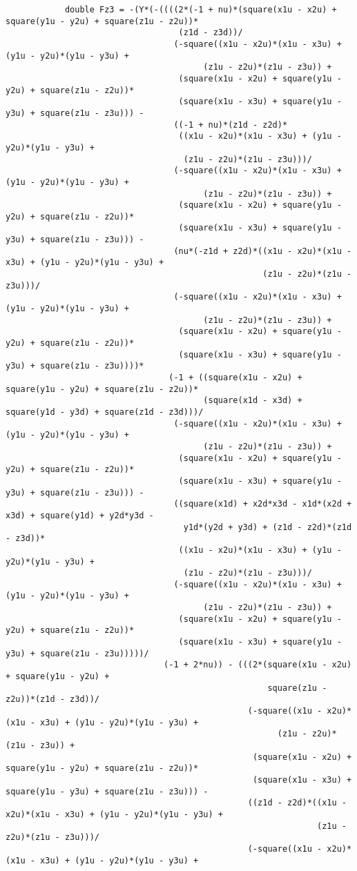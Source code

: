 \begin{lstlisting}
			double Fz3 = -(Y*(-((((2*(-1 + nu)*(square(x1u - x2u) + square(y1u - y2u) + square(z1u - z2u))*
								   (z1d - z3d))/
								  (-square((x1u - x2u)*(x1u - x3u) + (y1u - y2u)*(y1u - y3u) + 
										(z1u - z2u)*(z1u - z3u)) + 
								   (square(x1u - x2u) + square(y1u - y2u) + square(z1u - z2u))*
								   (square(x1u - x3u) + square(y1u - y3u) + square(z1u - z3u))) - 
								  ((-1 + nu)*(z1d - z2d)*
								   ((x1u - x2u)*(x1u - x3u) + (y1u - y2u)*(y1u - y3u) + 
									(z1u - z2u)*(z1u - z3u)))/
								  (-square((x1u - x2u)*(x1u - x3u) + (y1u - y2u)*(y1u - y3u) + 
										(z1u - z2u)*(z1u - z3u)) + 
								   (square(x1u - x2u) + square(y1u - y2u) + square(z1u - z2u))*
								   (square(x1u - x3u) + square(y1u - y3u) + square(z1u - z3u))) - 
								  (nu*(-z1d + z2d)*((x1u - x2u)*(x1u - x3u) + (y1u - y2u)*(y1u - y3u) + 
													(z1u - z2u)*(z1u - z3u)))/
								  (-square((x1u - x2u)*(x1u - x3u) + (y1u - y2u)*(y1u - y3u) + 
										(z1u - z2u)*(z1u - z3u)) + 
								   (square(x1u - x2u) + square(y1u - y2u) + square(z1u - z2u))*
								   (square(x1u - x3u) + square(y1u - y3u) + square(z1u - z3u))))*
								 (-1 + ((square(x1u - x2u) + square(y1u - y2u) + square(z1u - z2u))*
										(square(x1d - x3d) + square(y1d - y3d) + square(z1d - z3d)))/
								  (-square((x1u - x2u)*(x1u - x3u) + (y1u - y2u)*(y1u - y3u) + 
										(z1u - z2u)*(z1u - z3u)) + 
								   (square(x1u - x2u) + square(y1u - y2u) + square(z1u - z2u))*
								   (square(x1u - x3u) + square(y1u - y3u) + square(z1u - z3u))) - 
								  ((square(x1d) + x2d*x3d - x1d*(x2d + x3d) + square(y1d) + y2d*y3d - 
									y1d*(y2d + y3d) + (z1d - z2d)*(z1d - z3d))*
								   ((x1u - x2u)*(x1u - x3u) + (y1u - y2u)*(y1u - y3u) + 
									(z1u - z2u)*(z1u - z3u)))/
								  (-square((x1u - x2u)*(x1u - x3u) + (y1u - y2u)*(y1u - y3u) + 
										(z1u - z2u)*(z1u - z3u)) + 
								   (square(x1u - x2u) + square(y1u - y2u) + square(z1u - z2u))*
								   (square(x1u - x3u) + square(y1u - y3u) + square(z1u - z3u)))))/
								(-1 + 2*nu)) - (((2*(square(x1u - x2u) + square(y1u - y2u) + 
													 square(z1u - z2u))*(z1d - z3d))/
												 (-square((x1u - x2u)*(x1u - x3u) + (y1u - y2u)*(y1u - y3u) + 
													   (z1u - z2u)*(z1u - z3u)) + 
												  (square(x1u - x2u) + square(y1u - y2u) + square(z1u - z2u))*
												  (square(x1u - x3u) + square(y1u - y3u) + square(z1u - z3u))) - 
												 ((z1d - z2d)*((x1u - x2u)*(x1u - x3u) + (y1u - y2u)*(y1u - y3u) + 
															   (z1u - z2u)*(z1u - z3u)))/
												 (-square((x1u - x2u)*(x1u - x3u) + (y1u - y2u)*(y1u - y3u) + 

\end{lstlisting}
